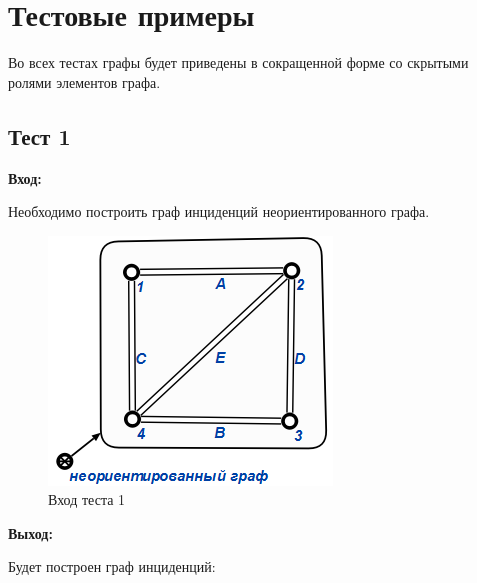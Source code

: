 \begin{enumerate}
\end{enumerate}

\section{Тестовые примеры}

Во всех тестах графы будет приведены в сокращенной форме со скрытыми ролями элементов графа.

\subsection{Тест 1}

\textbf{Вход:}

Необходимо построить граф инциденций неориентированного графа.

\begin{figure}[H]
  \centering
  \includegraphics[scale=0.7]{images/13.png}
  \caption{Вход теста 1}
\end{figure}

\textbf{Выход:}

Будет построен граф инциденций:

